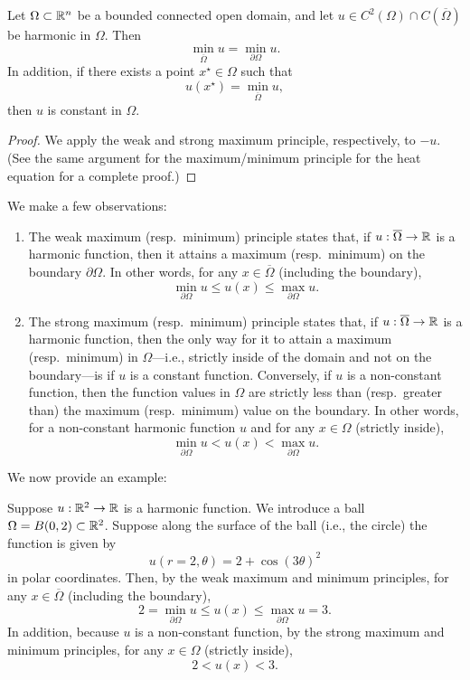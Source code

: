 \begin{theorem}
    Let $\Omega \subset \mathbb{R}^n$ be a bounded connected open domain, and let $u \in C^2(\Omega) \cap C(\overline{\Omega})$ be harmonic in $\Omega$. Then
    \[\min_{\overline{\Omega}} u = \min_{\partial\Omega} u.\]
    In addition, if there exists a point $x^\star \in \Omega$ such that
    \[u(x^\star) = \min_{\overline{\Omega}} u,\]
    then $u$ is constant in $\Omega$.
\end{theorem}
\begin{proof}
    We apply the weak and strong maximum principle, respectively, to $-u$. (See the same argument for the maximum/minimum principle for the heat equation for a complete proof.)
\end{proof}

We make a few observations:
\begin{enumerate}
    \item The weak maximum (resp.\ minimum) principle states that, if $u : \overline{\Omega} \to \mathbb{R}$ is a harmonic function, then it attains a maximum (resp.\ minimum) on the boundary $\partial\Omega$. In other words, for any $x \in \overline{\Omega}$ (including the boundary),
    \[\min_{\partial\Omega} u \leq u(x) \leq \max_{\partial\Omega} u.\]
    \item The strong maximum (resp.\ minimum) principle states that, if $u : \overline{\Omega} \to \mathbb{R}$ is a harmonic function, then the only way for it to attain a maximum (resp.\ minimum) in $\Omega$---i.e., strictly inside of the domain and not on the boundary---is if $u$ is a constant function. Conversely, if $u$ is a non-constant function, then the function values in $\Omega$ are strictly less than (resp.\ greater than) the maximum (resp.\ minimum) value on the boundary. In other words, for a non-constant harmonic function $u$ and for any $x \in \Omega$ (strictly inside),
    \[\min_{\partial\Omega} u < u(x) < \max_{\partial\Omega} u.\]
\end{enumerate}

We now provide an example:

\begin{example}
    Suppose $u : \mathbb{R}^2 \to \mathbb{R}$ is a harmonic function. We introduce a ball $\Omega = B(0, 2) \subset \mathbb{R}^2$. Suppose along the surface of the ball (i.e., the circle) the function is given by
    \[u(r = 2, \theta) = 2 + \cos(3\theta)^2\]
    in polar coordinates. Then, by the weak maximum and minimum principles, for any $x \in \overline{\Omega}$ (including the boundary),
    \[2 = \min_{\partial\Omega} u \leq u(x) \leq \max_{\partial\Omega} u = 3.\]
    In addition, because $u$ is a non-constant function, by the strong maximum and minimum principles, for any $x \in \Omega$ (strictly inside),
    \[2 < u(x) < 3.\]
\end{example}

